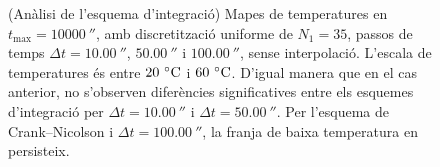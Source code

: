 \begin{figure}[ht]
\begin{subfigure}{.5\textwidth}
		\label{fig:esquema_12}
	\end{subfigure}
	\caption{(Anàlisi de l'esquema d'integració) Mapes de temperatures en $t_\text{max} = 10000 \ \second$, amb discretització uniforme de $N_1 = 35$, passos de temps $\Delta t = 10.00 \ \second$, $50.00 \ \second$ i $100.00 \ \second$, sense interpolació. L'escala de temperatures és entre $20 \ \celsius$ i $60 \ \celsius$. D'igual manera que en el cas anterior, no s'observen diferències significatives entre els esquemes d'integració per $\Delta t = 10.00 \ \second$ i $\Delta t = 50.00 \ \second$. Per l'esquema de Crank--Nicolson i $\Delta t = 100.00 \ \second$, la franja de baixa temperatura en persisteix.}		
	\label{fig:esquema_10000}
\end{figure} 